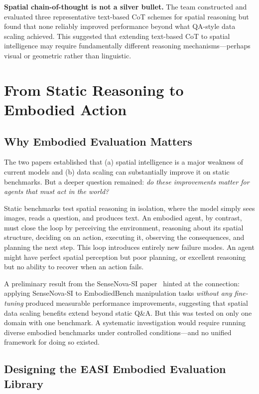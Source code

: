 \documentclass[
hf,
]{confart}
\begin{document}
\textbf{Spatial chain-of-thought is not a silver bullet.} The team constructed and evaluated three representative text-based CoT schemes for spatial reasoning but found that none reliably improved performance beyond what QA-style data scaling achieved. This suggested that extending text-based CoT to spatial intelligence may require fundamentally different reasoning mechanisms---perhaps visual or geometric rather than linguistic.

\section{From Static Reasoning to Embodied Action}
\label{sec:embodied}

\subsection{Why Embodied Evaluation Matters}

The two papers established that (a) spatial intelligence is a major weakness of current models and (b) data scaling can substantially improve it on static benchmarks. But a deeper question remained: \textit{do these improvements matter for agents that must act in the world?}

Static benchmarks test spatial reasoning in isolation, where the model simply sees images, reads a question, and produces text. An embodied agent, by contrast, must close the loop by perceiving the environment, reasoning about its spatial structure, deciding on an action, executing it, observing the consequences, and planning the next step. This loop introduces entirely new failure modes. An agent might have perfect spatial perception but poor planning, or excellent reasoning but no ability to recover when an action fails.

A preliminary result from the SenseNova-SI paper~\cite{cai2025scalingspatialintelligencemultimodal} hinted at the connection: applying SenseNova-SI to EmbodiedBench manipulation tasks \textit{without any fine-tuning} produced measurable performance improvements, suggesting that spatial data scaling benefits extend beyond static Q\&A. But this was tested on only one domain with one benchmark. A systematic investigation would require running diverse embodied benchmarks under controlled conditions---and no unified framework for doing so existed. 

\subsection{Designing the EASI Embodied Evaluation Library}
\end{document}
